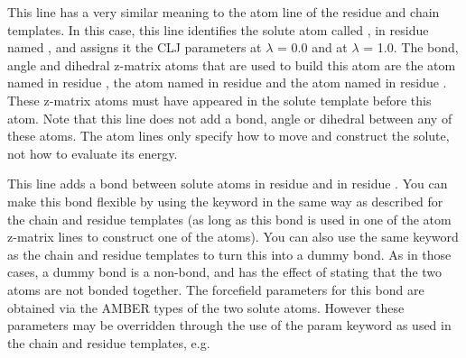 \documentclass[letterpaper,10pt,english]{sphinxmanual}
\begin{document}
This line has a very similar meaning to the atom line of the residue and chain templates. In this case, this line identifies the solute atom called , in residue named , and assigns it the CLJ parameters  at \(\lambda\) = 0.0 and  at \(\lambda\) = 1.0. The bond, angle and dihedral z-matrix atoms that are used to build this atom are the atom named  in residue , the atom named  in residue  and the atom named  in residue . These z-matrix atoms must have appeared in the solute template before this atom. Note that this line does not add a bond, angle or dihedral between any of these atoms. The atom lines only specify how to move and construct the solute, not how to evaluate its energy.

%
\begin{sphinxVerbatim}[commandchars=\\\{\}]
    
\end{sphinxVerbatim}

This line adds a bond between solute atoms  in residue  and  in residue . You can make this bond flexible by using the  keyword in the same way as described for the chain and residue templates (as long as this bond is used in one of the atom z-matrix lines to construct one of the atoms). You can also use the same  keyword as the chain and residue templates to turn this into a dummy bond. As in those cases, a dummy bond is a non-bond, and has the effect of stating that the two atoms are not bonded together. The forcefield parameters for this bond are obtained via the AMBER types of the two solute atoms. However these parameters may be overridden through the use of the param keyword as used in the chain and residue templates, e.g.

%
\begin{sphinxVerbatim}[commandchars=\\\{\}]
       
\end{sphinxVerbatim}
\end{document}
